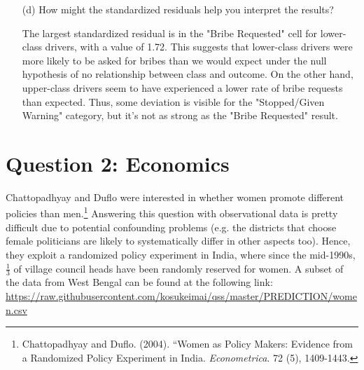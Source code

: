 \documentclass[12pt,letterpaper]{article}
\begin{document}
\begin{enumerate}
\begin{table}[h]
\begin{tabular}{l | c c c }
		\end{tabular}
	\end{table}
	
	
	\vspace{1cm}
	\item [(d)] How might the standardized residuals help you interpret the results?  
	\vspace{0.3cm}
	
	The largest standardized residual is in the "Bribe Requested" cell for lower-class drivers, with a value of 1.72. This suggests that lower-class drivers were more likely to be asked for bribes than we would expect under the null hypothesis of no relationship between class and outcome. On the other hand, upper-class drivers seem to have experienced a lower rate of bribe requests than expected. Thus, some deviation is visible for the "Stopped/Given Warning" category, but it's not as strong as the "Bribe Requested" result.
	
\end{enumerate}
\newpage

\section*{Question 2: Economics}
Chattopadhyay and Duflo were interested in whether women promote different policies than men.\footnote{Chattopadhyay and Duflo. (2004). ``Women as Policy Makers: Evidence from a Randomized Policy Experiment in India. \textit{Econometrica}. 72 (5), 1409-1443.} Answering this question with observational data is pretty difficult due to potential confounding problems (e.g. the districts that choose female politicians are likely to systematically differ in other aspects too). Hence, they exploit a randomized policy experiment in India, where since the mid-1990s, $\frac{1}{3}$ of village council heads have been randomly reserved for women. A subset of the data from West Bengal can be found at the following link: \url{https://raw.githubusercontent.com/kosukeimai/qss/master/PREDICTION/women.csv}\\
\end{document}
